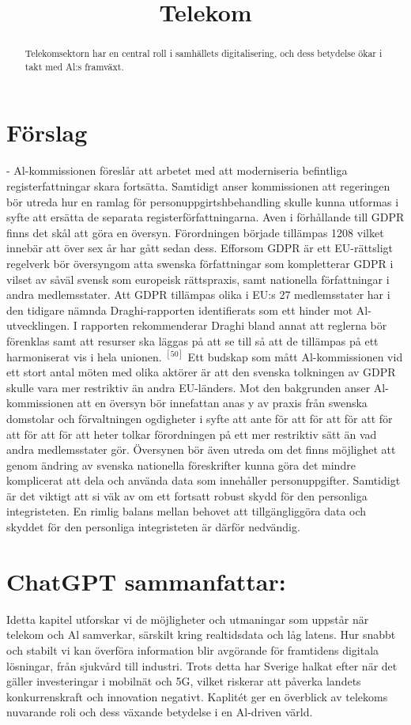 \section*{Förslag}
- Al-kommissionen föreslår att arbetet med att moderniseria befintliga registerfattningar skara fortsätta. Samtidigt anser kommissionen att regeringen bör utreda hur en ramlag för personuppgirtshbehandling skulle kunna utformas i syfte att ersätta de separata registerförfattningarna.
Aven i förhållande till GDPR finns det skål att göra en översyn. Förordningen började tillämpas 1208 vilket innebär att över sex år har gått sedan dess. Efforsom GDPR är ett EU-rättsligt regelverk bör översyngom atta swenska författningar som kompletterar GDPR i vilset av såväl svensk som europeisk rättspraxis, samt nationella författningar i andra medlemsstater. Att GDPR tillämpas olika i EU:s 27 medlemsstater har i den tidigare nämnda Draghi-rapporten identifierats som ett hinder mot Al-utvecklingen. I rapporten rekommenderar Draghi bland annat att reglerna bör förenklas samt att resurser ska läggas på att se till så att de tillämpas på ett harmoniserat vis i hela unionen. \({ }^{[50]}\) Ett budskap som mått Al-kommissionen vid ett stort antal möten med olika aktörer är att den svenska tolkningen av GDPR skulle vara mer restriktiv än andra EU-länders.
Mot den bakgrunden anser Al-kommissionen att en översyn bör innefattan anas y av praxis från swenska domstolar och förvaltningen ogdigheter i syfte att ante för att för att för att för att för att för att heter tolkar förordningen på ett mer restriktiv sätt än vad andra medlemsstater gör. Översynen bör även utreda om det finns möjlighet att genom ändring av svenska nationella föreskrifter kunna göra det mindre komplicerat att dela och använda data som innehåller personuppgifter. Samtidigt är det viktigt att si väk av om ett fortsatt robust skydd för den personliga integristeten. En rimlig balans mellan behovet att tillgängliggöra data och skyddet för den personliga integristeten är därför nedvändig.

\title{
Telekom
}
\section*{ChatGPT sammanfattar:}
\begin{abstract}
Telekomsektorn har en central roll i samhällets digitalisering, och dess betydelse ökar i takt med Al:s framväxt.
\end{abstract}
Idetta kapitel utforskar vi de möjligheter och utmaningar som uppstår när telekom och Al samverkar, särskilt kring realtidsdata och låg latens. Hur snabbt och stabilt vi kan överföra information blir avgörande för framtidens digitala lösningar, från sjukvård till industri. Trots detta har Sverige halkat efter när det gäller investeringar i mobilnät och 5G, vilket riskerar att påverka landets konkurrenskraft och innovation negativt. Kaplitét ger en överblick av telekoms nuvarande roli och dess växande betydelse i en Al-driven värld.
